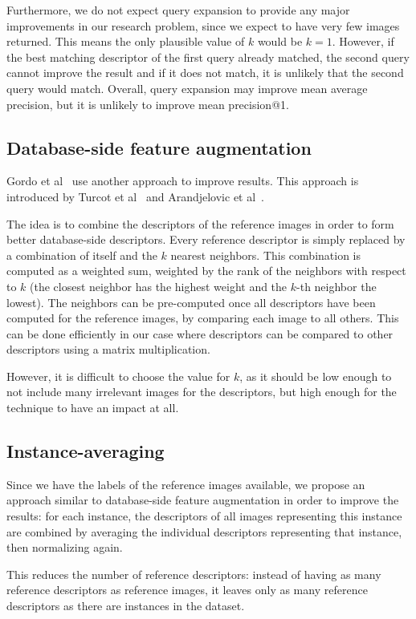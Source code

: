 Furthermore, we do not expect query expansion to provide
any major improvements in our research problem, since
we expect to have very few images returned. This means
the only plausible value of $k$ would be $k=1$. However,
if the best matching descriptor of the first query already
matched, the second query cannot improve the result
and if it does not match, it is unlikely that the second
query would match. Overall, query expansion may
improve mean average precision, but it is unlikely to
improve mean precision@1.

\subsection{Database-side feature augmentation}
Gordo et al~\cite{gordo_end--end_2016} use another
approach to improve results. This approach is introduced
by Turcot et al~\cite{turcot_better_2009} and
Arandjelovic et al~\cite{arandjelovic_three_2012}.

The idea is to combine the descriptors of the reference
images in order to form better database-side descriptors.
Every reference descriptor is simply replaced by a
combination of itself and the $k$ nearest neighbors.
This combination is computed as a weighted sum, weighted
by the rank of the neighbors with respect to $k$ (the
closest neighbor has the highest weight and the $k$-th
neighbor the lowest).
The neighbors can be pre-computed once all descriptors
have been computed for the reference images, by comparing
each image to all others. This can be done efficiently
in our case where descriptors can be compared to other
descriptors using a matrix multiplication.

However, it is difficult to choose the value for $k$, as
it should be low enough to not include many irrelevant
images for the descriptors, but high enough for the
technique to have an impact at all.

\subsection{Instance-averaging}
Since we have the labels of the reference images
available, we propose an approach similar to
database-side feature augmentation in order to
improve the results: for each instance, the descriptors
of all images representing this instance are combined
by averaging the individual descriptors representing
that instance, then normalizing again.

This reduces the number of reference descriptors:
instead of having as many reference descriptors as
reference images, it leaves only as many reference
descriptors as there are instances in the dataset.

